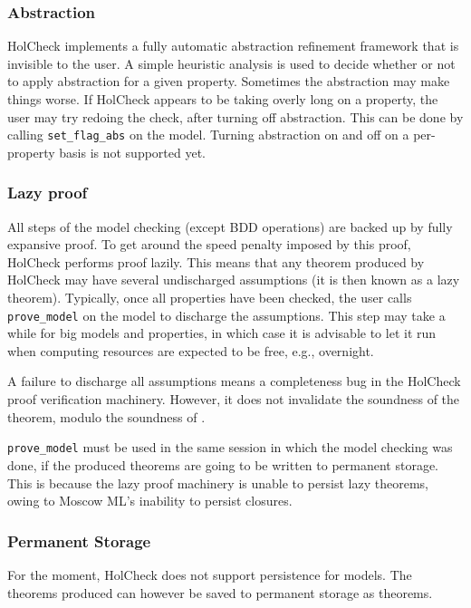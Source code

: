 \documentclass[12pt,fleqn]{article}
\newcommand{\hc}{HolCheck}
\begin{document}
\subsubsection{Abstraction}

\hc{} implements a fully automatic abstraction refinement framework that is invisible to the user. A simple heuristic analysis is used to decide whether or not to apply abstraction for a given property. Sometimes the abstraction may make things worse. If \hc{} appears to be taking overly long on a property, the user may try redoing the check, after turning off abstraction. This can be done by calling \texttt{set\_flag\_abs} on the model. Turning abstraction on and off on a per-property basis is not supported yet.

\subsubsection{Lazy proof}

All steps of the model checking (except BDD operations) are backed up by fully expansive proof. To get around the speed penalty imposed by this proof, \hc{} performs proof lazily. This means that any theorem produced by \hc{} may have several undischarged assumptions (it is then known as a lazy theorem). Typically, once all properties have been checked, the user calls \texttt{prove\_model} on the model to discharge the assumptions. This step may take a while for big models and properties, in which case it is advisable to let it run when computing resources are expected to be free, e.g., overnight.

A failure to discharge all assumptions means a completeness bug in the \hc{} proof verification machinery. However, it does not invalidate the soundness of the theorem, modulo the soundness of \HOL{}.

\texttt{prove\_model} must be used in the same session in which the model checking was done, if the produced theorems are going to be written to permanent storage. This is because the lazy proof machinery is unable to persist lazy theorems, owing to Moscow ML's inability to persist closures.

\subsubsection{Permanent Storage}

For the moment, \hc{} does not support persistence for models. The theorems produced can however be saved to permanent storage as \HOL{} theorems.


\printindex
\end{document}

